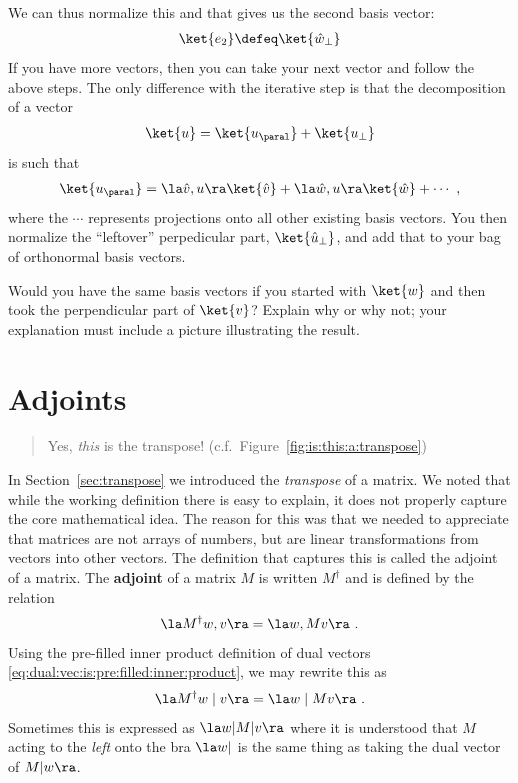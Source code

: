  We can thus normalize this and that gives us the second basis vector: 
\begin{align}
    \ket{e_2} \defeq \ket{\hat w_\perp}
\end{align}
If you have more vectors, then you can take your next vector and follow the above steps. The only difference with the iterative step is that the decomposition of a vector 
\begin{align}
\ket{u} = \ket{u_\paral} + \ket{u_\perp}    
\end{align}
is such that
\begin{align}
    \ket{u_\paral} = \la \hat{v}, u \ra \ket{\hat{v}} + \la \hat{w}, u \ra \ket{\hat{w}} + \cdots \ ,
\end{align}
where the $\cdots$ represents projections onto all other existing basis vectors. You then normalize the ``leftover'' perpedicular part, $\ket{\hat{u}_\perp}$, and add that to your bag of orthonormal basis vectors.


\begin{exercise}
Would you have the same basis vectors if you started with $\ket{w}$ and then took the perpendicular part of $\ket{v}$? Explain why or why not; your explanation must include a picture illustrating the result.
\end{exercise}


\section{Adjoints}
\label{sec:adjoint}

\begin{quote}
Yes, \emph{this} is the transpose! (c.f.~Figure~\ref{fig:is:this:a:transpose})
\end{quote}

In Section~\ref{sec:transpose} we introduced the \emph{transpose} of a matrix. We noted that while the working definition there is easy to explain, it does not properly capture the core mathematical idea. The reason for this was that we needed to appreciate that matrices are not arrays of numbers, but are linear transformations from vectors into other vectors. The definition that captures this is called the adjoint of a matrix. The \textbf{adjoint} of a matrix $M$ is written $M^\dag$ and is defined by the relation
\begin{align}
    \la M^\dag w, v \ra = \la w, M v \ra \ . 
\end{align}
Using the pre-filled inner product definition of dual vectors \eqref{eq:dual:vec:is:pre:filled:inner:product}, we may rewrite this as
\begin{align}
    \la M^\dag w \mid v \ra = \la w \mid M v \ra \ .
\end{align}
Sometimes this is expressed as $\la w | M | v \ra$ where it is understood that $M$ acting to the \emph{left} onto the bra $\la w |$ is the same thing as taking the dual vector of $M|w\ra$. 


